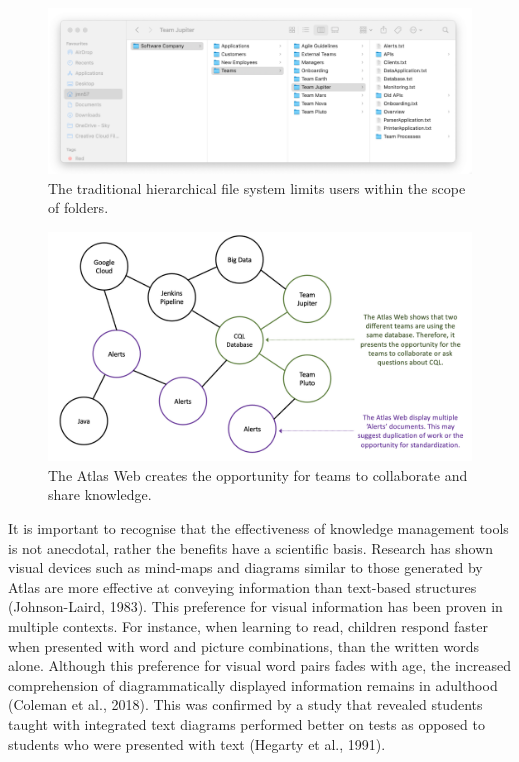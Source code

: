 \documentclass{article}
\begin{document}
\begin{figure}[!htb]
  \centering
      \includegraphics[width=1\textwidth]{images/filesystem-business-case.png}
  \caption{The traditional hierarchical file system limits users within the scope of folders.}
    \label{fig:filesystem}
\end{figure}

\begin{figure}[!hbt]
  \centering
      \includegraphics[width=1\textwidth]{images/benefits-of-web.png}
  \caption{The Atlas Web creates the opportunity for teams to collaborate and share knowledge.}
  \label{fig:benefits-of-web}
\end{figure}

It is important to recognise that the effectiveness of knowledge management tools is not anecdotal, rather the benefits have a scientific basis. Research has shown visual devices such as mind-maps and diagrams similar to those generated by Atlas are more effective at conveying information than text-based structures (Johnson-Laird, 1983). This preference for visual information has been proven in multiple contexts. For instance, when learning to read, children respond faster when presented with word and picture combinations, than the written words alone. Although this preference for visual word pairs fades with age, the increased comprehension of diagrammatically displayed information remains in adulthood (Coleman et al., 2018). This was confirmed by a study that revealed students taught with integrated text diagrams performed better on tests as opposed to students who were presented with text (Hegarty et al., 1991). 
\end{document}
